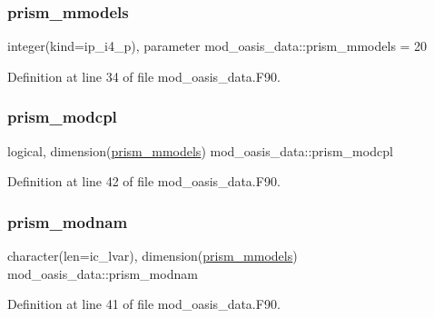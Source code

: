 \subsubsection{\texorpdfstring{prism\+\_\+mmodels}{prism\_mmodels}}
{\footnotesize\ttfamily integer(kind=ip\+\_\+i4\+\_\+p), parameter mod\+\_\+oasis\+\_\+data\+::prism\+\_\+mmodels = 20}



Definition at line 34 of file mod\+\_\+oasis\+\_\+data.\+F90.

\mbox{\label{namespacemod__oasis__data_ad5282716e60cbe5e8c1ced7758fc9ae1}} 
\subsubsection{\texorpdfstring{prism\+\_\+modcpl}{prism\_modcpl}}
{\footnotesize\ttfamily logical, dimension(\hyperlink{namespacemod__oasis__data_a11c61975c048981f7e508f1b6caf16b6}{prism\+\_\+mmodels}) mod\+\_\+oasis\+\_\+data\+::prism\+\_\+modcpl}



Definition at line 42 of file mod\+\_\+oasis\+\_\+data.\+F90.

\mbox{\label{namespacemod__oasis__data_abd4b98e9f321bc073d5a8e0292ba7131}} 
\subsubsection{\texorpdfstring{prism\+\_\+modnam}{prism\_modnam}}
{\footnotesize\ttfamily character(len=ic\+\_\+lvar), dimension(\hyperlink{namespacemod__oasis__data_a11c61975c048981f7e508f1b6caf16b6}{prism\+\_\+mmodels}) mod\+\_\+oasis\+\_\+data\+::prism\+\_\+modnam}



Definition at line 41 of file mod\+\_\+oasis\+\_\+data.\+F90.

\mbox{\label{namespacemod__oasis__data_a5915b02f461626d5a6cffbf037daa75e}} 
